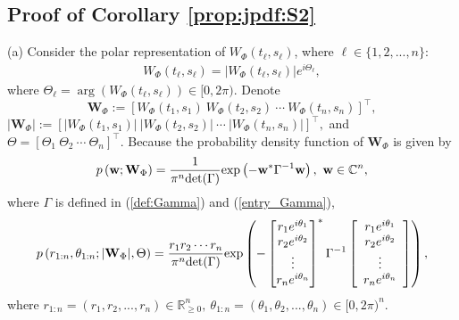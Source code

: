 \documentclass{amsart}
\begin{document}
\subsection{Proof of Corollary \ref{prop:jpdf:S2}}\label{sec:proof:prop:jpdf:S2}
(a) Consider the polar representation of
$W_{\Phi}(t_{\ell},s_{\ell})$, where $\ell\in\{1,2,...,n\}$:
\begin{align*}
W_{\Phi}(t_{\ell},s_{\ell})= |W_{\Phi}(t_{\ell},s_{\ell})|e^{i\Theta_{\ell}},
\end{align*}
where $\Theta_{\ell}=\arg \left(W_{\Phi}(t_{\ell},s_{\ell})\right)\in [0,2\pi)$.
Denote
$$\mathbf{W}_{\Phi}:=[W_{\Phi}(t_{1},s_{1})\ W_{\Phi}(t_{2},s_{2})\ \cdots\ W_{\Phi}(t_{n},s_{n})]^{\top},$$
$|\mathbf{W}_{\Phi}|:=[|W_{\Phi}(t_{1},s_{1})|\ |W_{\Phi}(t_{2},s_{2})|\ \cdots\ |W_{\Phi}(t_{n},s_{n})|]^{\top},$
and $\Theta=[\Theta_{1}\ \Theta_{2}\ \cdots\ \Theta_{n}]^{\top}$.
Because the probability density function of $\mathbf{W}_{\Phi}$ is given by
\begin{align*}
p\left(\mathbf{w};\mathbf{W}_{\Phi}\right)
=
\frac{1}{\pi^{n}\textup{det}(\Gamma)}
\textup{exp}\left(-\mathbf{w}^{*}\Gamma^{-1}\mathbf{w}\right), \ \mathbf{w}\in \mathbb{C}^{n},
\end{align*}
where $\Gamma$ is defined in (\ref{def:Gamma}) and (\ref{entry_Gamma}),
\begin{align}\label{jpdf:R&Theta}
p\left(r_{1:n},\theta_{1:n};|\mathbf{W}_{\Phi}|,\Theta\right)
=
\frac{r_{1}r_{2}\cdots r_{n}}{\pi^{n}\textup{det}(\Gamma)}
\textup{exp}\left(-\begin{bmatrix}r_{1}e^{i\theta_{1}} \\ r_{2}e^{i\theta_{2}}\\ \vdots \\ r_{n}e^{i\theta_{n}} \end{bmatrix}^{*}\Gamma^{-1}\left[\begin{array}{cc}r_{1}e^{i\theta_{1}}\\ r_{2}e^{i\theta_{2}} \\\vdots\\ r_{n}e^{i\theta_{n}}\end{array}\right]\right),
\end{align}
where  $r_{1:n}=(r_{1},r_{2},...,r_{n})\in \mathbb{R}_{\geq 0}^{n},\ \theta_{1:n}=(\theta_{1},\theta_{2},...,\theta_{n})\in[0,2\pi)^{n}.$
\end{document}
